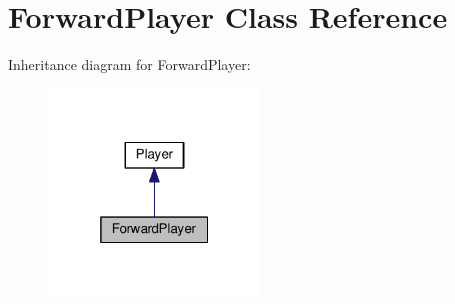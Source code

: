\hypertarget{classGUI_1_1ForwardPlayer}{}\section{Forward\+Player Class Reference}
\label{classGUI_1_1ForwardPlayer}


Inheritance diagram for Forward\+Player\+:
\nopagebreak
\begin{figure}[H]
\begin{center}
\leavevmode
\includegraphics[width=160pt]{classGUI_1_1ForwardPlayer__inherit__graph}
\end{center}
\end{figure}
